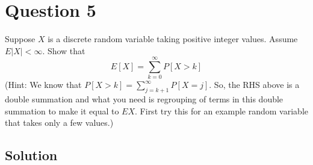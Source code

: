 \section*{Question 5}

Suppose \( X \) is a discrete random variable taking positive integer values.
Assume \( E|X|<\infty \).
Show that
\begin{equation*}
    E[X]=\sum_{k=0}^{\infty} P[X>k]
\end{equation*}
(Hint: We know that \( P[X>k]=\sum_{j=k+1}^{\infty} P[X=j] \).
So, the RHS above is a double summation and what you need is regrouping of terms in this double summation to make it equal to \( E X \).
First try this for an example random variable that takes only a few values.)

\subsection*{Solution}
